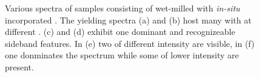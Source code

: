 \begin{figure}[!htb]
		\hfill
		\begin{subfigure}[t]{ 0.49\linewidth}
			\centering
			\caption{}
			\label{subfig::spectrum_5}
		\end{subfigure}
		\hfill
		\begin{subfigure}[t]{ 0.49\linewidth}
			\centering
			\caption{}
			\label{subfig::spectrum_6}
		\end{subfigure}
		\caption[Overview of diversity of \siv spectra.]{Various spectra of samples consisting of wet-milled \nds with \textit{in-situ} incorporated \sivs. The \nds yielding spectra (a) and (b) host many \sivs with \ZPL at different \cwls. (c) and (d) exhibit one dominant \ZPL and recognizeable sideband features. In (e) two \ZPLs of different intensity are visible, in (f) one \ZPL donminates the spectrum while some \ZPLs of lower intensity are present.}
		\label{fig::various_spectra}
	\end{figure}

